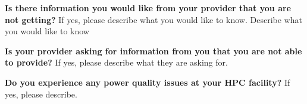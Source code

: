 \wl
\noindent
\textbf{Is there information you would like from your provider that you are not getting?}
If yes, please describe what you would like to know.	
Describe what you would like to know	

\wl
\noindent
\textbf{Is your provider asking for information from you that you are not able to provide?}
If yes, please describe what they are asking for.	

\wl
\noindent
\textbf{Do you experience any power quality issues at your HPC facility?}
If yes, please describe. 


